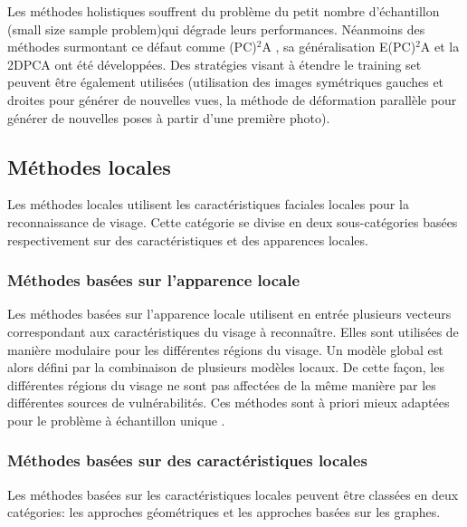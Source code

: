 Les méthodes holistiques souffrent du problème du petit nombre d'échantillon (small size sample problem)qui dégrade leurs performances. Néanmoins des méthodes surmontant ce défaut comme (PC)$^2$A \citep{WU}, sa généralisation E(PC)$^2$A \cite{SONG} et la 2DPCA \citep{JIAN} ont été développées. Des stratégies visant à étendre le training set peuvent être également utilisées (utilisation des images symétriques gauches et droites pour générer de nouvelles vues, la méthode de déformation parallèle pour générer de nouvelles poses à partir d'une première photo). 
\subsection{Méthodes locales}
Les méthodes locales utilisent les caractéristiques faciales locales pour la reconnaissance de visage. Cette catégorie se divise en deux sous-catégories basées respectivement sur des caractéristiques et des apparences locales.
\subsubsection{Méthodes basées sur l'apparence locale}

Les méthodes basées sur l'apparence locale utilisent en entrée plusieurs vecteurs correspondant aux caractéristiques du visage à reconnaître. Elles sont utilisées de manière modulaire pour les différentes régions du visage. Un modèle global est alors défini par la combinaison de plusieurs modèles locaux. De cette façon, les différentes régions du visage ne sont pas affectées de la même manière par les différentes sources de vulnérabilités. Ces méthodes sont à priori mieux adaptées pour le problème à échantillon
unique \cite{XIAO}.
\subsubsection{Méthodes basées sur des caractéristiques locales}
Les méthodes basées sur les caractéristiques locales peuvent être classées en deux catégories: les approches géométriques et les approches basées sur les graphes.

